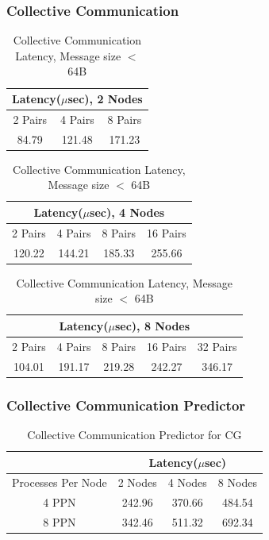 \documentclass{beamer}
\begin{document}
\begin{frame}
\frametitle{Collective Communication}

\begin{table}[h]
\centering
\caption{Collective Communication Latency, Message size $<$ 64B }
\begin{tabular}{|c|c|c|}
\hline
\multicolumn{3}{|c|}{Latency($\mu$sec), 2 Nodes}\\
\hline
2 Pairs & 4 Pairs & 8 Pairs\\
\hline
84.79 & 121.48 & 171.23\\
\hline
\end{tabular}
\end{table}




\begin{table}[h]
\centering
\caption{Collective Communication Latency, Message size $<$ 64B }
\begin{tabular}{|c|c|c|c|}
\hline
\multicolumn{4}{|c|}{Latency($\mu$sec), 4 Nodes}\\
\hline
2 Pairs & 4 Pairs & 8 Pairs & 16 Pairs\\
\hline
120.22 & 144.21 & 185.33 & 255.66 \\
\hline
\end{tabular}
\end{table}




\begin{table}[h]
\centering
\caption{Collective Communication Latency, Message size $<$ 64B }
\begin{tabular}{|c|c|c|c|c|}
\hline
\multicolumn{5}{|c|}{Latency($\mu$sec), 8 Nodes}\\
\hline
2 Pairs & 4 Pairs & 8 Pairs & 16 Pairs & 32 Pairs\\
\hline
104.01 & 191.17 & 219.28 & 242.27 & 346.17 \\
\hline
\end{tabular}
\end{table}

\end{frame}


\begin{frame}
\frametitle{Collective Communication Predictor}

\begin{table}[h]
\centering
\caption{Collective Communication Predictor for CG}
\begin{tabular}{|c|c|c|c|}
\hline
& \multicolumn{3}{|c|}{Latency($\mu$sec)}\\
\hline
Processes Per Node & 2 Nodes & 4 Nodes& 8 Nodes\\
\hline
4 PPN & 242.96 & 370.66  & 484.54\\
8 PPN & 342.46 & 511.32 & 692.34\\ 
\hline
\end{tabular}
\end{table}
\end{frame}
\end{document}
